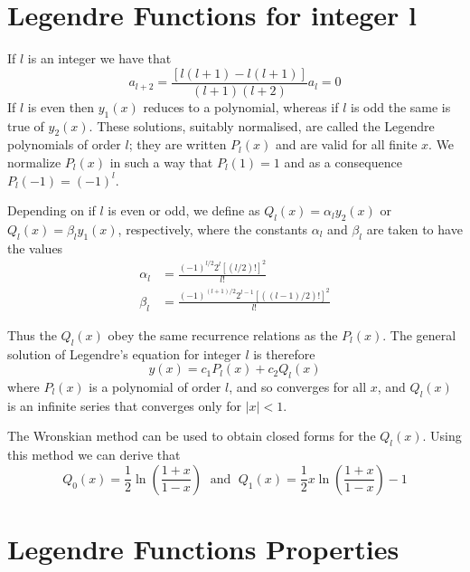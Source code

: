 \documentclass[12pt, a4paper, oneside, openright, titlepage]{book}
\begin{document}
\section{Legendre Functions for integer l}

If $l$ is an integer we have that \begin{equation*}
    a_{l+2} = \frac{[l(l+1)-l(l+1)]}{(l+1)(l+2)}a_l = 0
\end{equation*}
If $l$ is even then $y_1(x)$ reduces to a polynomial, whereas if $l$ is odd the same is true of $y_2(x)$. These solutions, suitably normalised, are called the Legendre polynomials of order $l$; they are written $P_l(x)$ and are valid for all finite $x$. We normalize $P_l(x)$ in such a way that $P_l(1) = 1$ and as a consequence $P_l(-1) = (-1)^l$.

\begin{defn}
    Depending on if $l$ is even or odd, we define  as $Q_l(x) = \alpha_ly_2(x)$ or $Q_l(x) = \beta_ly_1(x)$, respectively, where the constants $\alpha_l$ and $\beta_l$ are taken to have the values \begin{align*}
        \alpha_l &= \frac{(-1)^{l/2}2^l[(l/2)!]^2}{l!} \\
        \beta_l &= \frac{(-1)^{(l+1)/2}2^{l-1}[((l-1)/2)!]^2}{l!}
    \end{align*}
\end{defn}
Thus the $Q_l(x)$ obey the same recurrence relations as the $P_l(x)$. The general solution of Legendre's equation for integer $l$ is therefore \begin{equation*}
    y(x) = c_1P_l(x) + c_2Q_l(x)
\end{equation*}
where $P_l(x)$ is a polynomial of order $l$, and so converges for all $x$, and $Q_l(x)$ is an infinite series that converges only for $|x| < 1$.

The Wronskian method can be used to obtain closed forms for the $Q_l(x)$. Using this method we can derive that \begin{equation*}
    Q_0(x) = \frac{1}{2}\ln\left(\frac{1+x}{1-x}\right)\;\text{ and }\;Q_1(x) = \frac{1}{2}x\ln\left(\frac{1+x}{1-x}\right) - 1
\end{equation*}



\section{Legendre Functions Properties}
\end{document}
